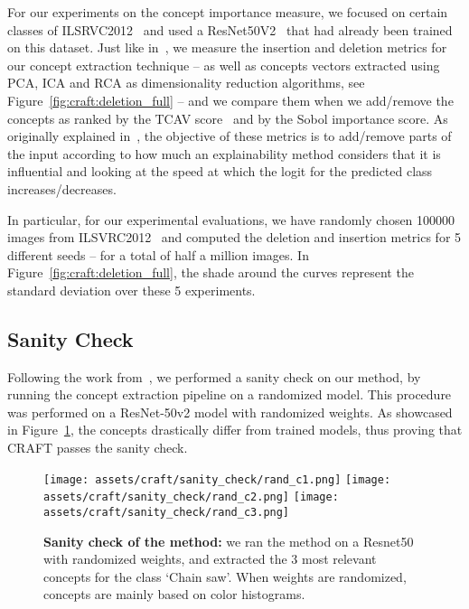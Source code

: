 For our experiments on the concept importance measure, we focused on certain classes of ILSRVC2012~\cite{imagenet_cvpr09} and used a ResNet50V2~\cite{he2016deep} that had already been trained on this dataset. Just like in~\cite{ghorbani2017interpretation, zhang2021invertible}, we measure the insertion and deletion metrics for our concept extraction technique -- as well as concepts vectors extracted using PCA, ICA and RCA as dimensionality reduction algorithms, see Figure~\ref{fig:craft:deletion_full} -- and we compare them when we add/remove the concepts as ranked by the TCAV score~\cite{kim2018interpretability} and by the Sobol importance score. As originally explained in~\cite{petsiuk2018rise}, the objective of these metrics is to add/remove parts of the input according to how much an explainability method considers that it is influential and looking at the speed at which the logit for the predicted class increases/decreases.

In particular, for our experimental evaluations, we have randomly chosen 100000 images from ILSVRC2012~\cite{imagenet_cvpr09} and computed the deletion and insertion metrics for 5 different seeds -- for a total of half a million images. In Figure~\ref{fig:craft:deletion_full}, the shade around the curves represent the standard deviation over these 5 experiments.

\clearpage

\subsection{Sanity Check}
\label{app:craft:sanity-checks}

Following the work from~\cite{adebayo2018sanity}, we performed a sanity check on our method, by running the concept extraction pipeline on a randomized model. This procedure was performed on a ResNet-50v2 model with randomized weights. As showcased in Figure~\ref{fig:craft:sanity_check}, the concepts drastically differ from trained models, thus proving that CRAFT passes the sanity check.

\begin{figure}[h]
    \centering
    \texttt{[image: assets/craft/sanity\_check/rand\_c1.png]}
    \texttt{[image: assets/craft/sanity\_check/rand\_c2.png]}
    \texttt{[image: assets/craft/sanity\_check/rand\_c3.png]}
    \caption{\textbf{Sanity check of the method:} we ran the method on a Resnet50 with randomized weights, and extracted the 3 most relevant concepts for the class `Chain saw'. When weights are randomized, concepts are mainly based on color histograms.}
    \label{fig:craft:sanity_check}
\end{figure}
